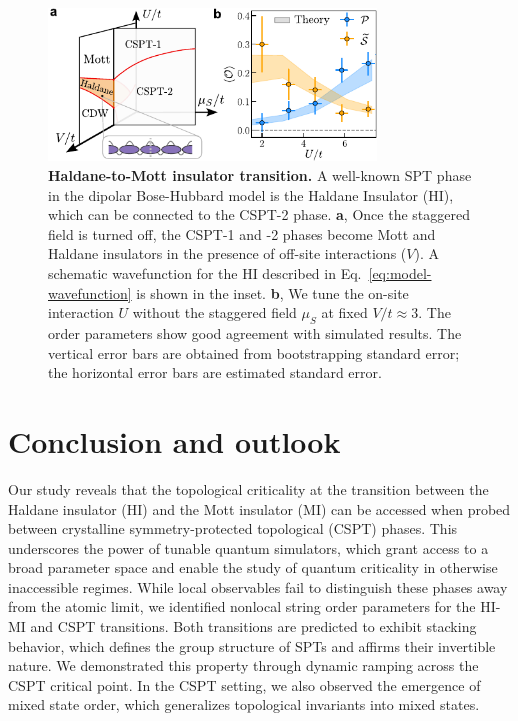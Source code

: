 \documentclass[preprint,superscriptaddress,floatfix, nofootinbib]{revtex4-2}
\begin{document}
\begin{figure}
    \centering
    \includegraphics[width=247pt]{figures/Fig_Haldane_V3.pdf}
    \caption{\textbf{Haldane-to-Mott insulator transition.} A well-known SPT phase in the dipolar Bose-Hubbard model is the Haldane Insulator (HI), which can be connected to the CSPT-2 phase. \textbf{a}, Once the staggered field is turned off, the CSPT-1 and -2 phases become Mott and Haldane insulators in the presence of off-site interactions ($V$). A schematic wavefunction for the HI described in Eq.~\eqref{eq:model-wavefunction} is shown in the inset. \textbf{b}, We tune the on-site interaction $U$ without the staggered field $\mu_S$ at fixed $V/t\approx3$. The order parameters show good agreement with simulated results. The vertical error bars are obtained from bootstrapping standard error; the horizontal error bars are estimated standard error.
    }
    \label{fig: HI}
\end{figure}

\section{Conclusion and outlook}

Our study reveals that the topological criticality at the transition between the Haldane insulator (HI) and the Mott insulator (MI) can be accessed when probed between crystalline symmetry-protected topological (CSPT) phases.
This underscores the power of tunable quantum simulators, which grant access to a broad parameter space and enable the study of quantum criticality in otherwise inaccessible regimes. While local observables fail to distinguish these phases away from the atomic limit, we identified nonlocal string order parameters for the HI-MI and CSPT transitions. Both transitions are predicted to exhibit stacking behavior, which defines the group structure of SPTs and affirms their invertible nature. We demonstrated this property through dynamic ramping across the CSPT critical point. In the CSPT setting, we also observed the emergence of mixed state order, which generalizes topological invariants into mixed states.
\end{document}
